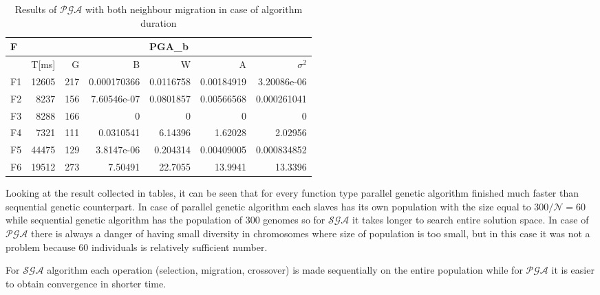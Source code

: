 \nopagebreak
\begin{table}[!htpb]
	\label{pga2conv}
	\caption{Results of $\mathcal{PGA}$ with both neighbour migration in case of
	algorithm duration}
	\centering
	\begin{tabular}{l||r|r|r|r|r|r|}
        \textsc{F} & \multicolumn{6}{c|}{PGA\_b} \\ \hline
		          &T[ms]&G& B&W&A&$\sigma^2$ \\ \hline
			\textsc{F1}&12605&217&0.000170366&0.0116758&0.00184919&3.20086e-06\\ \hline
			\textsc{F2}&8237&156&7.60546e-07&0.0801857&0.00566568&0.000261041\\ \hline
			\textsc{F3}&8288&166&0&0&0&0\\ \hline
			\textsc{F4}&7321&111&0.0310541&6.14396&1.62028&2.02956\\ \hline
			\textsc{F5}&44475&129&3.8147e-06&0.204314&0.00409005&0.000834852\\ \hline
			\textsc{F6}&19512&273&7.50491&22.7055&13.9941&13.3396\\ \hline
	\end{tabular}
\end{table}
Looking at the result collected in tables, it can be seen that
for every function type parallel genetic algorithm finished much faster than
sequential genetic counterpart. In case of parallel genetic algorithm each slaves
has its own population with the size equal to $300/\mathcal{N}=60$ while sequential
genetic algorithm has the population of $300$ genomes so for $\mathcal{SGA}$ it takes longer to search
entire solution space. In case of $\mathcal{PGA}$ there is always a danger of
having small diversity in chromosomes where size of population is too small, but
in this case it was not a problem because $60$ individuals is relatively
sufficient number.

For $\mathcal{SGA}$ algorithm each operation (selection, migration, crossover)
is made sequentially on the entire population while for $\mathcal{PGA}$ it is
easier to obtain convergence in shorter time.

